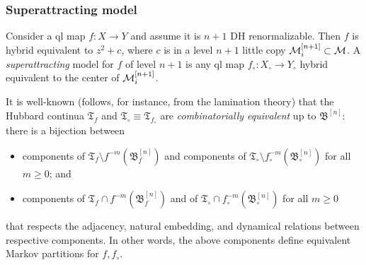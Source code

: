 \documentclass{amsart}
\newcommand{\Hub}{{\mathfrak T}}
\newcommand{\bbush}{{\boldsymbol {\mathfrak B} }}
\newcommand{\1}{{\mathbb 1 }}
\begin{document}
\subsubsection{Superattracting model}
\label{sss:psib:super attr model}
Consider a ql map $f\colon X\to Y$ and assume it is $n+1$ DH renormalizable. Then $f$ is hybrid equivalent to $z^2+c$, where $c$ is in a level $n+1$ little copy ${\mathcal M}^{[n+1]}_i\subset {\mathcal M}$. A \emph{superattracting} model for $f$ of level $n+1$ is any ql map $f_\circ \colon X_\circ \to Y_\circ$ hybrid equivalent to the center of ${\mathcal M}^{[n+1]}_i$. 


It is well-known (follows, for instance, from the lamination theory) that the Hubbard continua $\Hub_f$ and $\Hub_\circ\equiv \Hub_{f_\circ}$ are \emph{combinatorially equivalent} up to $\bbush^{[n]}$: there is a bijection between 
\begin{itemize}
\item components of $\Hub_f\setminus f^{-m}\left(\bbush^{[n]}_f\right)$ and  components of $\Hub_\circ\setminus f^{-m}_\circ\left(\bbush^{[n]}_\circ\right)$ for all $m\ge0$; and
\item components of $\Hub_f\cap f^{-m}\left(\bbush^{[n]}_f\right)$ and of $\Hub_\circ\cap  f^{-m}_\circ\left(\bbush^{[n]}_\circ\right)$ for all $m\ge0$
\end{itemize}
that respects the adjacency, natural embedding, and dynamical relations between respective components.  In other words, the above components define equivalent Markov partitions for $f, f_\circ$.
\end{document}
